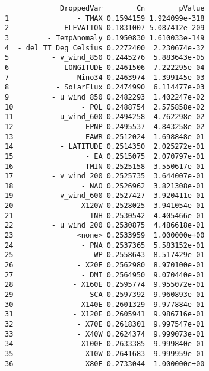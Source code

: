 \documentclass[fleqn,11pt]{article}
\begin{document}
\singlespacing
\begin{footnotesize}
\begin{verbatim}
             DroppedVar        Cn        pValue
1                - TMAX 0.1594159 1.924099e-318
2           - ELEVATION 0.1831007 5.087412e-209
3         - TempAnomaly 0.1950830 1.610033e-149
4  - del_TT_Deg_Celsius 0.2272400  2.230674e-32
5          - v_wind_850 0.2445276  5.883643e-05
6           - LONGITUDE 0.2461506  7.222295e-04
7              - Nino34 0.2463974  1.399145e-03
8           - SolarFlux 0.2474990  6.114477e-03
9          - u_wind_850 0.2482293  1.402247e-02
10                - POL 0.2488754  2.575858e-02
11         - u_wind_600 0.2494258  4.762298e-02
12               - EPNP 0.2495537  4.843258e-02
13               - EAWR 0.2512024  1.698848e-01
14           - LATITUDE 0.2514350  2.025272e-01
15                 - EA 0.2515075  2.070797e-01
16               - TMIN 0.2525158  3.550617e-01
17         - v_wind_200 0.2525735  3.644007e-01
18                - NAO 0.2526962  3.821308e-01
19         - v_wind_600 0.2527427  3.920411e-01
20              - X120W 0.2528025  3.941054e-01
21                - TNH 0.2530542  4.405466e-01
22         - u_wind_200 0.2530875  4.486618e-01
23               <none> 0.2533959  1.000000e+00
24                - PNA 0.2537365  5.583152e-01
25                 - WP 0.2558643  8.517429e-01
26               - X20E 0.2562980  8.970100e-01
27                - DMI 0.2564950  9.070440e-01
28              - X160E 0.2595774  9.955072e-01
29                - SCA 0.2597392  9.960893e-01
30              - X140E 0.2601329  9.977884e-01
31              - X120E 0.2605941  9.986716e-01
32               - X70E 0.2618301  9.997547e-01
33               - X40W 0.2624374  9.999073e-01
34              - X100E 0.2633385  9.999840e-01
35               - X10W 0.2641683  9.999959e-01
36               - X80E 0.2733044  1.000000e+00
\end{verbatim}
\end{footnotesize}
\end{document}
